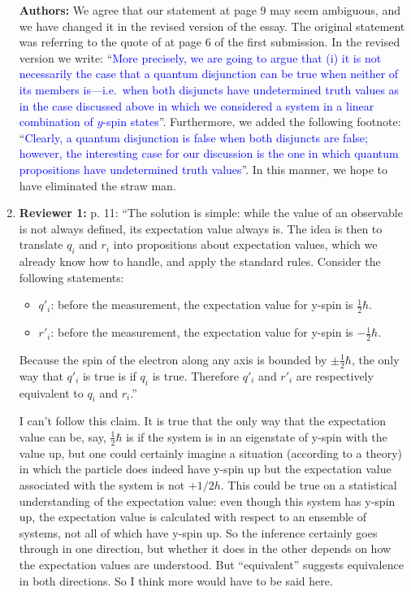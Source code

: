 \documentclass[11pt, executivepaper]{article}
\begin{document}
\begin{enumerate}
\textbf{Authors:} We agree that our statement at page 9 may seem ambiguous, and we have changed it in the revised version of the essay. The original statement was referring to the quote of \cite{deRonde:2016} at page 6 of the first submission. In the revised version we write: ``\textcolor{blue}{More precisely, we are going to argue that (i) it is not necessarily the case that a quantum disjunction can be true when neither of its members is---i.e.\ when both disjuncts have undetermined truth values as in the case discussed above in which we considered a system in a linear combination of $y$-spin states}''. Furthermore, we added the following footnote: ``\textcolor{blue}{Clearly, a quantum disjunction is false when both disjuncts are false; however, the interesting case for our discussion is the one in which quantum propositions have undetermined truth values}''. In this manner, we hope to have eliminated the straw man.

\item \textbf{Reviewer 1:} p. 11: ``The solution is simple: while the value of an observable is not always defined, its expectation value always is. The idea is
then to translate $q_i$ and $r_i$ into propositions about expectation values, which we already know how to handle, and apply the standard rules. Consider the following statements:
\begin{itemize}
\item $q'_i$: before the measurement, the expectation value for y-spin is $\frac{1}{2} \hbar$.

\item $r'_i$: before the measurement, the expectation value for y-spin is $-\frac{1}{2} \hbar$.
\end{itemize}
Because the spin of the electron along any axis is bounded by $\pm\frac{1}{2} \hbar$, the only way that $q'_i$ is true is if $q_i$ is true. Therefore $q'_i$ and $r'_i$ are respectively equivalent to $q_i$ and $r_i$.''

I can't follow this claim. It is true that the only way that the expectation value can be, say, $\frac{1}{2} \hbar$ is if the system is in an eigenstate of y-spin with the value up, but one could certainly imagine a situation (according to a theory) in which the particle does indeed have y-spin up but the expectation value associated with the system is not $+1/2 h$. This could be true on a statistical understanding of the expectation value: even though this system has y-spin up, the expectation value is calculated with respect to an ensemble of systems, not all of which have y-spin up. So the inference certainly goes through in one direction, but whether it does in the other depends on how the expectation values are understood. But ``equivalent'' suggests equivalence in both directions. So I think more would have to be said here.


\end{enumerate}
\end{document}
